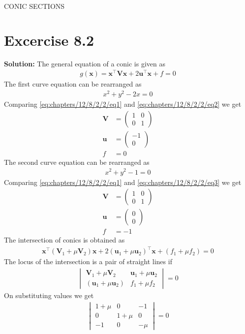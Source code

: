 \documentclass[12pt]{article}
\newcommand{\mydet}[1]{\ensuremath{\begin{vmatrix}#1\end{vmatrix}}}
\providecommand{\brak}[1]{\ensuremath{\left(#1\right)}}
\newcommand{\solution}{\noindent \textbf{Solution: }}
\newcommand{\myvec}[1]{\ensuremath{\begin{pmatrix}#1\end{pmatrix}}}
\let\vec\mathbf
\begin{document}
\begin{center}
\textbf\large{CONIC SECTIONS}

\end{center}
\section*{Excercise 8.2}

\solution
\fi
The general equation of a conic is given as
\begin{align}
	\label{eq:chapters/12/8/2/2/eq1}
	g\brak{\vec{x}} = \vec{x}^\top \vec{V}\vec{x}+2\vec{u}^\top \vec{x}+f=0
\end{align}
The first curve equation can be rearranged as
\begin{align}
	\label{eq:chapters/12/8/2/2/eq2}
	x^2+y^2-2x=0
\end{align}
Comparing \eqref{eq:chapters/12/8/2/2/eq1} and \eqref{eq:chapters/12/8/2/2/eq2} we get
\begin{align}
	\vec{V} &= \myvec{1&0\\0&1}\\
	\vec{u} &= \myvec{-1\\0}\\
	f &= 0
\end{align}
The second curve equation can be rearranged as
\begin{align}
	\label{eq:chapters/12/8/2/2/eq3}
	x^2+y^2-1=0
\end{align}
Comparing \eqref{eq:chapters/12/8/2/2/eq1} and \eqref{eq:chapters/12/8/2/2/eq3} we get
\begin{align}
	\vec{V} &= \myvec{1&0\\0&1}\\
	\vec{u} &= \myvec{0\\0}\\
	f &= -1
\end{align}
The intersection of conics is obtained as
\begin{align}
	\vec{x}^\top\brak{\vec{V}_1+\mu\vec{V}_2}\vec{x}+2\brak{\vec{u}_1+\mu\vec{u}_2}^\top\vec{x}+\brak{f_1+\mu f_2}=0
\end{align}
The locus of the intersection is a pair of straight lines if
\begin{align}
	\mydet{\vec{V}_1+\mu\vec{V}_2 & \vec{u}_1+\mu\vec{u}_2 \\ \brak{\vec{u}_1+\mu\vec{u}_2} & f_1+\mu f_2} = 0
\end{align}
On substituting values we get
\begin{align}
	\mydet{1+\mu & 0 & -1 \\ 0 & 1+\mu & 0 \\ -1 & 0 & -\mu} = 0
\end{align}
\end{document}
